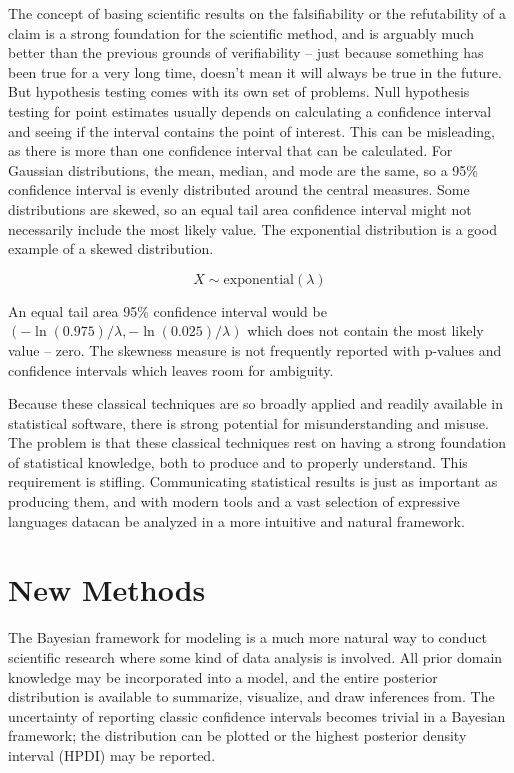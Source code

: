 \documentclass[11pt, oneside, openany]{scrbook}
\begin{document}
The concept of basing scientific results on the falsifiability \citep{popper1959logic} or the refutability of a claim is a strong foundation for the scientific method, and is arguably much better than the previous grounds of verifiability -- just because something has been true for a very long time, doesn't mean it will always be true in the future. But hypothesis testing comes with its own set of problems. Null hypothesis testing for point estimates usually depends on calculating a confidence interval and seeing if the interval contains the point of interest. This can be misleading, as there is more than one confidence interval that can be calculated. For Gaussian distributions, the mean, median, and mode are the same, so a 95\% confidence interval is evenly distributed around the central measures. Some distributions are skewed, so an equal tail area confidence interval might not necessarily include the most likely value. The exponential distribution is a good example of a skewed distribution.

\[X \sim \mathrm{exponential} (\lambda)\]

An equal tail area 95\% confidence interval would be \(\left(-\ln(0.975)/\lambda, -\ln(0.025)/\lambda\right)\) which does not contain the most likely value -- zero. The skewness measure is not frequently reported with p-values and confidence intervals which leaves room for ambiguity.

Because these classical techniques are so broadly applied and readily available in statistical software, there is strong potential for misunderstanding and misuse. The problem is that these classical techniques rest on having a strong foundation of statistical knowledge, both to produce and to properly understand. This requirement is stifling. Communicating statistical results is just as important as producing them, and with modern tools and a vast selection of expressive languages datacan be analyzed in a more intuitive and natural framework.

\hypertarget{new-methods}{%
\section{New Methods}\label{new-methods}}

The Bayesian framework for modeling is a much more natural way to conduct scientific research where some kind of data analysis is involved. All prior domain knowledge may be incorporated into a model, and the entire posterior distribution is available to summarize, visualize, and draw inferences from. The uncertainty of reporting classic confidence intervals becomes trivial in a Bayesian framework; the distribution can be plotted or the highest posterior density interval (HPDI) may be reported.
\end{document}

